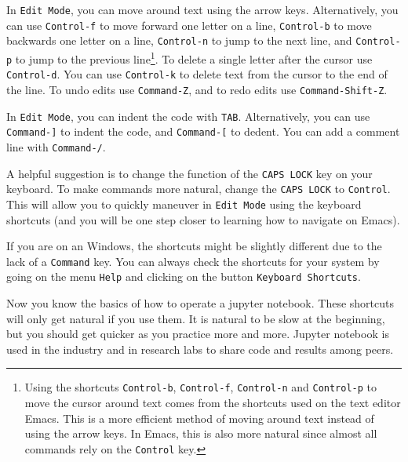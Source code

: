 \documentclass[12pt, a4paper]{article}
\begin{document}
In \texttt{Edit Mode}, you can move around text using the arrow keys.
Alternatively, you can use \texttt{Control-f} to move forward one letter on a line, \texttt{Control-b} to move backwards one letter on a line, \texttt{Control-n} to jump to the next line, and \texttt{Control-p} to jump to the previous line\footnote{Using the shortcuts \texttt{Control-b}, \texttt{Control-f}, \texttt{Control-n} and \texttt{Control-p} to move the cursor around text comes from the shortcuts used on the text editor Emacs. This is a more efficient method of moving around text instead of using the arrow keys. In Emacs, this is also more natural since almost all commands rely on the \texttt{Control} key.}.
To delete a single letter after the cursor use \texttt{Control-d}.
You can use \texttt{Control-k} to delete text from the cursor to the end of the line.
To undo edits use \texttt{Command-Z}, and to redo edits use \texttt{Command-Shift-Z}.

In \texttt{Edit Mode}, you can indent the code with \texttt{TAB}. Alternatively, you can use \texttt{Command-]} to indent the code, and \texttt{Command-[} to dedent.
You can add a comment line with \texttt{Command-/}.

A helpful suggestion is to change the function of the \texttt{CAPS LOCK} key on your keyboard.
To make commands more natural, change the \texttt{CAPS LOCK} to \texttt{Control}.
This will allow you to quickly maneuver in \texttt{Edit Mode} using the keyboard shortcuts (and you will be one step closer to learning how to navigate on Emacs).

If you are on an Windows, the shortcuts might be slightly different due to the lack of a \texttt{Command} key.
You can always check the shortcuts for your system by going on the menu \texttt{Help} and clicking on the button \texttt{Keyboard Shortcuts}.

Now you know the basics of how to operate a jupyter notebook.
These shortcuts will only get natural if you use them.
It is natural to be slow at the beginning, but you should get quicker as you practice more and more.
Jupyter notebook is used in the industry and in research labs to share code and results among peers.
\end{document}
